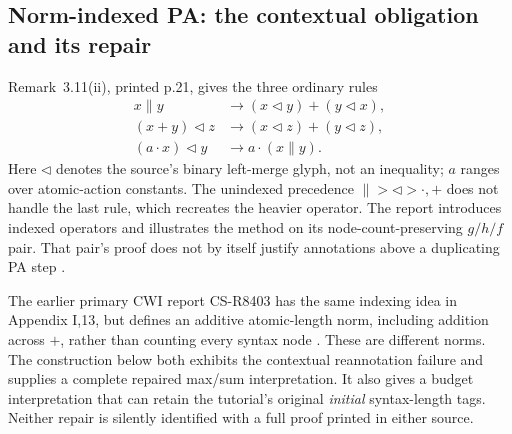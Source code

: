 \subsection{Norm-indexed PA: the contextual obligation and its repair}
\label{sec:p12-klop1987-pa-norm-proof}

Remark~3.11(ii), printed p.21, gives the three ordinary rules
\begin{align*}
 x\parallel y&\to(x\mathbin{\lhd}y)+(y\mathbin{\lhd}x),\\
 (x+y)\mathbin{\lhd}z&\to(x\mathbin{\lhd}z)+(y\mathbin{\lhd}z),\\
 (a\cdot x)\mathbin{\lhd}y&\to a\cdot(x\parallel y).
\end{align*}
Here \(\lhd\) denotes the source's binary left-merge glyph, not
an inequality; \(a\) ranges over atomic-action constants. The
unindexed precedence \(\parallel>\lhd>\cdot,+\) does not handle
the last rule, which recreates the heavier operator. The report
introduces indexed operators and illustrates the method on its
node-count-preserving \(g/h/f\) pair. That pair's proof does not
by itself justify annotations above a duplicating PA step
\parencite[p.~21]{Klop1987CWITutorial}.

The earlier primary CWI report CS-R8403 has the same indexing idea
in Appendix I,13, but defines an additive atomic-length norm, including
addition across \(+\), rather than counting every syntax node
\parencite[pp.~30--34]{BergstraKlop1984PAIndexingReport}.
These are different norms. The construction below both exhibits the
contextual reannotation failure and supplies a complete repaired
max/sum interpretation. It also gives a budget interpretation that
can retain the tutorial's original \emph{initial} syntax-length tags.
Neither repair is silently identified with a full proof printed in
either source.

